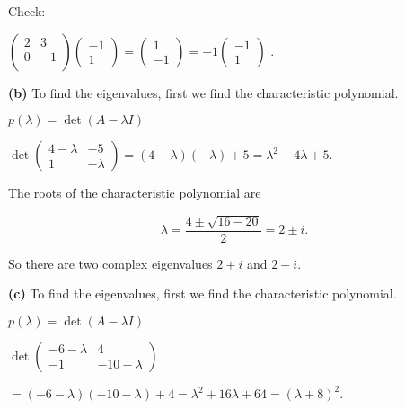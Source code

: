 \documentclass[oneside,12pt]{amsart}
\begin{document}
Check:

\bigskip

$
\begin{pmatrix}
2 & 3 \\
0 & -1 \\
\end{pmatrix}
\begin{pmatrix}
-1 \\ 1
\end{pmatrix}
=
\begin{pmatrix}
1 \\ -1
\end{pmatrix}
=
-1
\begin{pmatrix}
-1 \\ 1
\end{pmatrix}
$
.


\bigskip

\textbf{(b)} To find the eigenvalues, first we find the characteristic polynomial.

$p(\lambda)=\det(A-\lambda I)$


\bigskip
$
\det
\begin{pmatrix}
4 - \lambda & -5 \\
1 &  - \lambda
\end{pmatrix}
= (4-\lambda)(-\lambda) +5= \lambda^2 -4\lambda + 5.
$

\bigskip

The roots of the characteristic polynomial are

$$
\lambda = \frac{4\pm\sqrt{16-20}}{2} = 2\pm i.
$$

So there are two complex eigenvalues $2+i$ and $2-i$.


\bigskip

\textbf{(c)} To find the eigenvalues, first we find the characteristic polynomial.

$p(\lambda)=\det(A-\lambda I)$


\bigskip
$
\det
\begin{pmatrix}
-6 - \lambda & 4 \\
-1 &  -10 - \lambda
\end{pmatrix}
$

\bigskip

$= (-6-\lambda)(-10-\lambda) +4= \lambda^2 +16\lambda + 64 = (\lambda+8)^2.$

\bigskip
\end{document}

